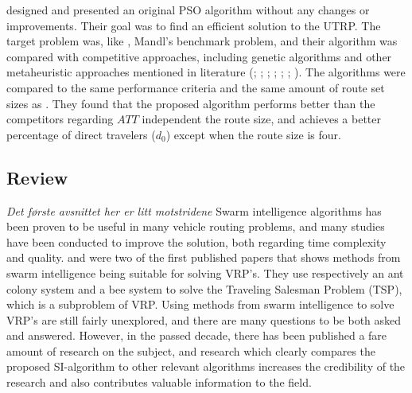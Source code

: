 \citet{kechagiopoulos14} designed and presented an original PSO algorithm without any changes or improvements. Their goal was to find an efficient solution to the UTRP. The target problem was, like \citet{nikolic14}, Mandl's benchmark problem, and their algorithm was compared with competitive approaches, including genetic algorithms and other metaheuristic approaches mentioned in literature (\citet{baaj91}; \citet{chakroborty02}; \citet{kidwai98}; \citet{fan10}; \citet{fan09-2}; \citet{zhang10}; \citet{chew12}). The algorithms were compared to the same performance criteria and the same amount of route set sizes as \citet{nikolic14}. They found that the proposed algorithm performs better than the competitors regarding $ATT$ independent the route size, and achieves a better percentage of direct travelers ($d_0$) except when the route size is four.  

\subsection{Review}
\emph{\color{blue}Det første avsnittet her er litt motstridene}
Swarm intelligence algorithms has been proven to be useful in many vehicle routing problems, and many studies have been conducted to improve the solution, both regarding time complexity and quality. \citet{dorigo97} and \citet{lucic03} were two of the first published papers that shows methods from swarm intelligence being suitable for solving VRP's. They use respectively an ant colony system and a bee system to solve the Traveling Salesman Problem (TSP), which is a subproblem of VRP. Using methods from swarm intelligence to solve VRP's are still fairly unexplored, and there are many questions to be both asked and answered. However, in the passed decade, there has been published a fare amount of research on the subject, and research which clearly compares the proposed SI-algorithm to other relevant algorithms increases the credibility of the research and also contributes valuable information to the field. 

